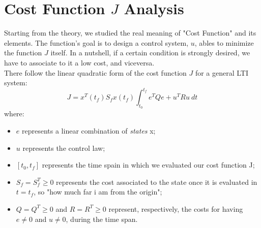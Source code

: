 \section{Cost Function $J$ Analysis}
Starting from the theory, we studied the real meaning of "Cost Function" and its elements. The function's goal is to design a control system, $u$, ables to minimize the function $J$ itself. In a nutshell, if a certain condition is strongly desired, we have to associate to it a low cost, and viceversa. \\
There follow the linear quadratic form of the cost function $J$ for a general LTI system:
\begin{equation}
J = x^{T}(t_{f}) S_{f} x(t_{f})\int_{t_{0}}^{t_{f}} e^{T} Q e + u^{T} R u \ dt
\end{equation}
where:
\begin{itemize}
	\item $e$ represents a linear combination of \textit{states} x;
	\item $u$ represents the control law;
	\item $ [t_{0},t_{f}] $ represents the time spain in which we evaluated our cost function J;
	\item $ S_{f} = S_{f}^{T} \geq0 $ represents the cost associated to the state once it is evaluated in $t=t_{f}$, so "how much far i am from the origin";
	\item $ Q=Q^{T}\geq 0 $ and $ R=R^{T}\geq 0 $ represent, respectively, the costs for having $e\neq0$ and $u\neq0$, during the time span.
\end{itemize}
